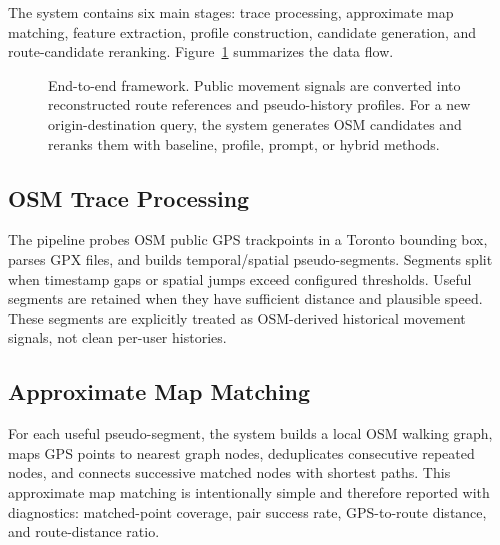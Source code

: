 The system contains six main stages: trace processing, approximate map matching, feature extraction, profile construction, candidate generation, and route-candidate reranking. Figure~\ref{fig:pipeline} summarizes the data flow.

\begin{figure}[t]
  \centering
  \caption{End-to-end framework. Public movement signals are converted into reconstructed route references and pseudo-history profiles. For a new origin-destination query, the system generates OSM candidates and reranks them with baseline, profile, prompt, or hybrid methods.}
  \label{fig:pipeline}
\end{figure}

\subsection{OSM Trace Processing}
The pipeline probes OSM public GPS trackpoints in a Toronto bounding box, parses GPX files, and builds temporal/spatial pseudo-segments. Segments split when timestamp gaps or spatial jumps exceed configured thresholds. Useful segments are retained when they have sufficient distance and plausible speed. These segments are explicitly treated as OSM-derived historical movement signals, not clean per-user histories.

\subsection{Approximate Map Matching}
For each useful pseudo-segment, the system builds a local OSM walking graph, maps GPS points to nearest graph nodes, deduplicates consecutive repeated nodes, and connects successive matched nodes with shortest paths. This approximate map matching is intentionally simple and therefore reported with diagnostics: matched-point coverage, pair success rate, GPS-to-route distance, and route-distance ratio.

